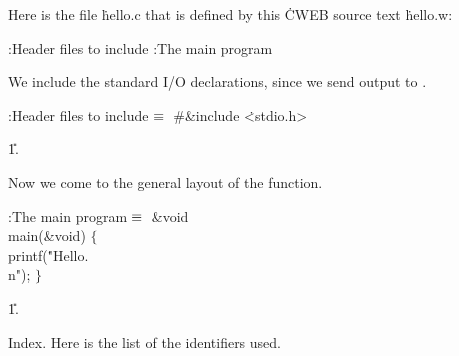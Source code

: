 


Here is the file \.{hello.c} that is defined
by this \.{CWEB} source text \.{hello.w}:

\Y\B{}:Header files to include\X\6
:The main program\X\par
\fi

We include the standard I/O declarations, since we send output to .

\Y\B\4:Header files to include\X${}\equiv{}$\6
\8\#\&{include} \.{<stdio.h>}\par
\U1.\fi

Now we come to the general layout of the  function.

\Y\B\4:The main program\X${}\equiv{}$\6
\1\1\&{void} \\{main}(\&{void})\2\2\6
${}\{{}$\1\6
\\{printf}(\.{"Hello.\\n"});\6
\4${}\}{}$\2\par
\U1.\fi

Index.
Here is the list of the identifiers used.
\fi

\inx
\fin
\con
